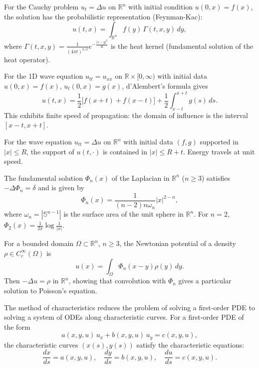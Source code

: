 \begin{example}
For the Cauchy problem $u_t = \Delta u$ on $\mathbb{R}^n$ with initial condition $u(0,x) = f(x)$, the solution has the probabilistic representation (Feynman-Kac):
\[
u(t,x) = \int_{\mathbb{R}^n} f(y) \, \Gamma(t,x,y) \, dy,
\]
where $\Gamma(t,x,y) = \frac{1}{(4\pi t)^{n/2}} e^{-\frac{|x-y|^2}{4t}}$ is the heat kernel (fundamental solution of the heat operator).
\end{example}

\begin{example}[d'Alembert's Formula for Wave Equation ($n=1$)]
For the 1D wave equation $u_{tt} = u_{xx}$ on $\mathbb{R} \times [0,\infty)$ with initial data $u(0,x) = f(x)$, $u_t(0,x) = g(x)$, d'Alembert's formula gives
\[
u(t,x) = \frac{1}{2}\bigl[f(x+t) + f(x-t)\bigr] + \frac{1}{2}\int_{x-t}^{x+t} g(s)\,ds.
\]
This exhibits finite speed of propagation: the domain of influence is the interval $[x-t, x+t]$.
\end{example}

\begin{example}
For the wave equation $u_{tt} = \Delta u$ on $\mathbb{R}^n$ with initial data $(f,g)$ supported in $|x| \leq R$, the support of $u(t,\cdot)$ is contained in $|x| \leq R + t$. Energy travels at unit speed.
\end{example}

\begin{example}
The fundamental solution $\Phi_n(x)$ of the Laplacian in $\mathbb{R}^n$ ($n \geq 3$) satisfies $-\Delta \Phi_n = \delta$ and is given by
\[
\Phi_n(x) = \frac{1}{(n-2)n\omega_n} |x|^{2-n},
\]
where $\omega_n = |\mathbb{S}^{n-1}|$ is the surface area of the unit sphere in $\mathbb{R}^n$. For $n=2$, $\Phi_2(x) = \frac{1}{2\pi}\log\frac{1}{|x|}$.
\end{example}

\begin{example}
For a bounded domain $\Omega \subset \mathbb{R}^n$, $n \geq 3$, the Newtonian potential of a density $\rho \in C_c^\infty(\Omega)$ is
\[
u(x) = \int_\Omega \Phi_n(x-y) \rho(y)\,dy.
\]
Then $-\Delta u = \rho$ in $\mathbb{R}^n$, showing that convolution with $\Phi_n$ gives a particular solution to Poisson's equation.
\end{example}

\begin{definition}
The method of characteristics reduces the problem of solving a first-order PDE to solving a system of ODEs along characteristic curves. For a first-order PDE of the form
\[
a(x,y,u)\,u_x + b(x,y,u)\,u_y = c(x,y,u),
\]
the characteristic curves $(x(s), y(s))$ satisfy the characteristic equations:
\[
\frac{dx}{ds} = a(x,y,u), \quad \frac{dy}{ds} = b(x,y,u), \quad \frac{du}{ds} = c(x,y,u).
\]
\end{definition}

